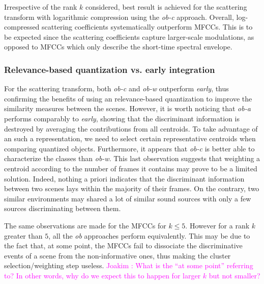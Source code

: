 \documentclass[journal]{IEEEtran}
\makeatletter
\newcommand*{\vs}{vs.\@\xspace}
\newcommand{\ja}[1]{\textcolor{magenta}{Joakim : #1}}
\makeatother
\begin{document}
Irrespective of the rank $k$ considered, best result is achieved for the scattering transform with logarithmic compression using the \emph{ob-c} approach. Overall, log-compressed scattering coefficients systematically outperform MFCCs. This is to be expected since the scattering coefficients capture larger-scale modulations, as opposed to MFCCs which only describe the short-time spectral envelope.

\subsubsection*{Relevance-based quantization \vs early integration}

For the scattering transform, both \emph{ob-c} and \emph{ob-w} outperform \emph{early}, thus confirming the benefits of using an relevance-based quantization to improve the similarity measures between the scenes. However, it is worth noticing that \emph{ob-a} performs comparably to \emph{early}, showing that the discriminant information is destroyed by averaging the contributions from all centroids. To take advantage of an such a representation, we need to select certain representative centroids when comparing quantized objects. Furthermore, it appears that \emph{ob-c} is better able to characterize the classes than \emph{ob-w}. This last observation suggests that weighting a centroid according to the number of frames it contains may prove to be a limited solution. Indeed, nothing a priori indicates that the discriminant information between two scenes lays within the majority of their frames. On the contrary, two similar environments may shared a lot of similar sound sources with only a few sources discriminating between them.

The same observations are made for the MFCCs for $k\leq5$. However for a rank $k$ greater than $5$, all the \emph{ob} approaches perform equivalently. This may be due to the fact that, at some point, the MFCCs fail to dissociate the discriminative events of a scene from the non-informative ones, thus making the cluster selection/weighting step useless. \ja{What is the ``at some point'' referring to? In other words, why do we expect this to happen for larger $k$ but not smaller?}
	
\end{document}
